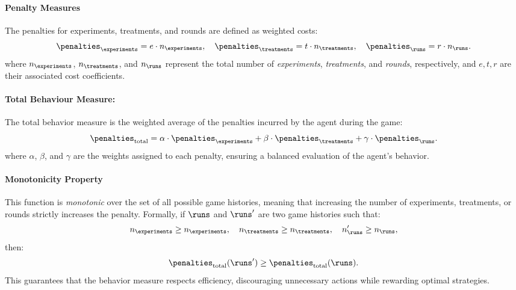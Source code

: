 \documentclass{uai2024} %
\begin{document}
            \paragraph{Penalty Measures}
                The penalties for experiments, treatments, and rounds are defined as weighted costs:
                \begin{equation*}
                    \penalties_{\experiments} = e \cdot n_\experiments, \quad
                    \penalties_{\treatments} = t \cdot n_\treatments, \quad
                    \penalties_{\runs} = r \cdot n_\runs.
                \end{equation*}
                where $ n_\experiments $, $ n_\treatments $, and $ n_\runs $ represent the total number of \emph{experiments}, \emph{treatments}, and \emph{rounds}, respectively, and $ e, t, r $ are their associated cost coefficients.


            \paragraph{Total Behaviour Measure:}
                The total behavior measure is the weighted average of the penalties incurred by the agent during the game:
                    \begin{equation*}
                        \penalties_{\text{total}} = \alpha \cdot \penalties_{\experiments} + \beta \cdot \penalties_{\treatments} + \gamma \cdot \penalties_{\runs}.
                    \end{equation*}
                where $\alpha$, $\beta$, and $\gamma$ are the weights assigned to each penalty, ensuring a balanced evaluation of the agent's behavior.

                
            \paragraph{Monotonicity Property}
                This function is \emph{monotonic} over the set of all possible game histories, meaning that increasing the number of experiments, treatments, or rounds strictly increases the penalty. 
                Formally, if $\runs$ and $\runs'$ are two game histories such that:
                \begin{equation*}
                    n_\experiments \geq n_\experiments, \quad
                    n_\treatments \geq n_\treatments, \quad
                    n_\runs' \geq n_\runs,
                \end{equation*}
                then:
                \begin{equation*}
                    \penalties_{\text{total}}(\runs') \geq \penalties_{\text{total}}(\runs).
                \end{equation*}
                This guarantees that the behavior measure respects efficiency, discouraging unnecessary actions while rewarding optimal strategies.
\end{document}
